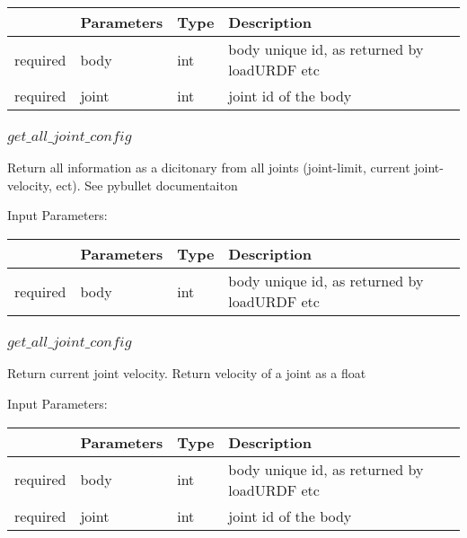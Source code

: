 \documentclass[
	ngerman,
	accentcolor=9c,%
	type=intern,
	marginpar=false
	]{tudapub}
\begin{document}
\begin{tabular}{|p{}|p{}|p{}| p{}|}
\hline
 & \textbf{Parameters} & \textbf{Type} & \textbf{Description} \\
\hline
required & body & int & body unique id, as returned by loadURDF etc\\
\hline
required & joint & int & joint id of the body\\
\hline

\end{tabular}
\vspace{0.5cm}



\subsubsection{$get\_all\_joint\_config$}
\noindent  Return all information as a dicitonary from all joints (joint-limit, current joint-velocity, ect). See pybullet documentaiton


\vspace{0.5cm}
\noindent Input Parameters:
\vspace{0.5cm}

\begin{tabular}{|p{}|p{}|p{}| p{}|}
\hline
 & \textbf{Parameters} & \textbf{Type} & \textbf{Description} \\
\hline
required & body & int & body unique id, as returned by loadURDF etc\\
\hline

\end{tabular}
\vspace{0.5cm}




\subsubsection{$get\_all\_joint\_config$}
\noindent  Return current joint velocity. Return velocity of a joint as a float

\vspace{0.5cm}
\noindent Input Parameters:
\vspace{0.5cm}

\begin{tabular}{|p{}|p{}|p{}| p{}|}
\hline
 & \textbf{Parameters} & \textbf{Type} & \textbf{Description} \\
\hline
required & body & int & body unique id, as returned by loadURDF etc\\
\hline
required & joint & int & joint id of the body\\
\hline

\end{tabular}
\vspace{0.5cm}
\end{document}
